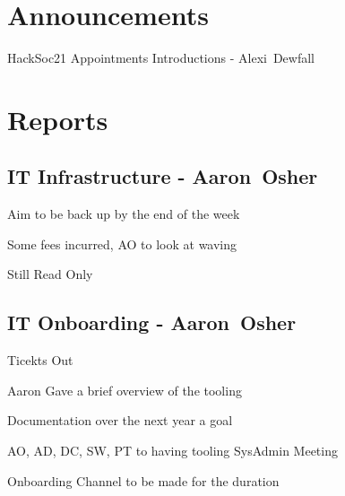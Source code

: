 \documentclass[11pt,hacksoc]{meetingmins}
\begin{document}
\maketitle

\section{Announcements}
\begin{items}
\item{HackSoc21 Appointments Introductions - Alexi~Dewfall}
\end{items}

\section{Reports}
\subsection{IT Infrastructure - Aaron~Osher}
\begin{hiddensubitems}
\item {Aim to be back up by the end of the week}
\item {Some fees incurred, AO to look at waving}
\item {Still Read Only}
\end{hiddensubitems}
\subsection{IT Onboarding - Aaron~Osher}
\begin{hiddensubitems}
\item {Ticekts Out}
\item {Aaron Gave a brief overview of the tooling}
\item {Documentation over the next year a goal}
\item {AO, AD, DC, SW, PT to having tooling SysAdmin Meeting}
\item {Onboarding Channel to be made for the duration}
\end{hiddensubitems}
\end{document}
